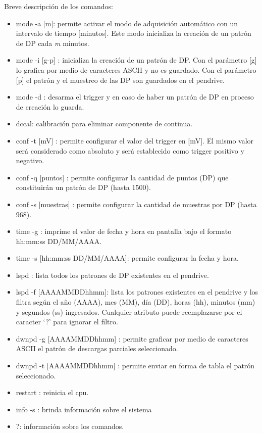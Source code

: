 \vspace{5mm}

Breve descripción de los comandos:
\begin{itemize}
\item mode -a [m]: permite activar el modo de adquisición automático con un intervalo de tiempo [minutos]. Este modo inicializa la creación de un patrón de DP cada \textit{m} minutos.
\item mode -i [g-p] : inicializa la creación de un patrón de DP. Con el parámetro [g] lo grafica por medio de caracteres ASCII y no es guardado. Con el parámetro [p] el patrón y el muestreo de las DP son guardados en el pendrive.
\item mode -d : desarma el trigger y en caso de haber un patrón de DP en proceso de creación lo guarda.
\item dccal: calibración para eliminar componente de continua.
\item conf -t [mV] : permite configurar el valor del trigger en [mV]. El mismo valor será considerado como absoluto y será establecido como trigger positivo y negativo.
\item conf -q [puntos] : permite configurar la cantidad de puntos (DP) que constituirán un patrón de DP (hasta 1500). 
\item conf -s [muestras] : permite configurar la cantidad de muestras por DP (hasta 968).
\item time -g : imprime el valor de fecha y hora en pantalla bajo el formato hh:mm:ss DD/MM/AAAA.
\item time -s [hh:mm:ss DD/MM/AAAA]: permite configurar la fecha y hora.
\item lspd : lista todos los patrones de DP existentes en el pendrive.
\item lspd -f [AAAAMMDDhhmm]:  lista los patrones existentes en el pendrive y los filtra según el año (AAAA), mes (MM), día (DD), horas (hh), minutos (mm) y segundos (ss) ingresados. Cualquier atributo puede reemplazarse por el caracter ‘?’ para ignorar el filtro.
\item dwnpd -g [AAAAMMDDhhmm] : permite graficar por medio de caracteres ASCII el patrón de descargas parciales seleccionado.
\item dwnpd -t [AAAAMMDDhhmm] : permite enviar en forma de tabla el patrón seleccionado.
\item restart : reinicia el cpu.
\item info -s : brinda información sobre el sistema
\item ?: información sobre los comandos.
\end{itemize}

